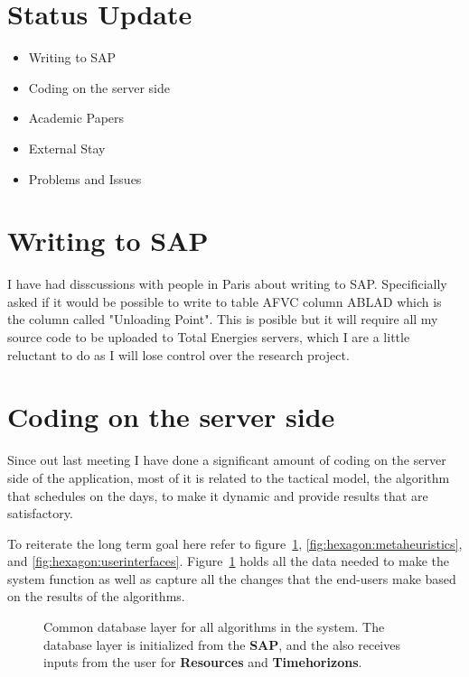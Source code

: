 \section{Status Update}

\begin{itemize}
	\item Writing to SAP
	\item Coding on the server side
	\item Academic Papers
	\item External Stay
	\item Problems and Issues
\end{itemize}

\section{Writing to SAP}
I have had disscussions with people in Paris about writing to SAP. Specificially 
asked if it would be possible to write to table AFVC column ABLAD which is the 
column called "Unloading Point". This is posible but it will require all
my source code to be uploaded to Total Energies servers, which I are a little 
reluctant to do as I will lose control over the research project.

\section{Coding on the server side}
Since out last meeting I have done a significant amount of coding on the server side
of the application, most of it is related to the tactical model, the algorithm that schedules
on the days, to make it dynamic and provide results that are satisfactory.

To reiterate the long term goal here refer to figure~\ref{fig:hexagon:persistence}, \ref{fig:hexagon:metaheuristics}, and \ref{fig:hexagon:userinterfaces}.
Figure~\ref{fig:hexagon:persistence} holds all the data
needed to make the system function as well as capture all the changes that the end-users make based on the results of the algorithms.


\begin{figure}[H]
	\centering
    \drawModelSetupHexagon[userinterface=false, persistence=true, metaheuristics=false]
	\caption{Common database layer for all algorithms in the system. The database layer is initialized from
	the \textbf{SAP}, and the also receives inputs from the user for \textbf{Resources} and \textbf{Timehorizons}.}
	\label{fig:hexagon:persistence}
\end{figure}

